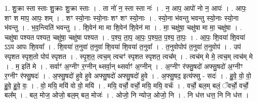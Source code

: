 \documentclass[17pt]{extarticle}
\begin{document}
1. शु॒क्रा स्ता स्ताः शु॒क्राः शु॒क्रा स्ताः । . ता नो॑ न॒ स्ता स्ता नः॑ । . न॒ आप॒ आपो॑ नो न॒ आपः॑ । . आपः॒ शꣳ श माप॒ आपः॒ शम् । . शꣳ स्यो॒नाः स्यो॒नाः शꣳ शꣳ स्यो॒नाः । . स्यो॒ना भ॑वन्तु भवन्तु स्यो॒नाः स्यो॒ना भ॑वन्तु । . भ॒व॒न्त्विति॑ भवन्तु । . शि॒वेन॑ मा मा शि॒वेन॑ शि॒वेन॑ मा । . मा॒ चक्षु॑षा॒ चक्षु॑षा मा मा॒ चक्षु॑षा । . चक्षु॑षा पश्यत पश्यत॒ चक्षु॑षा॒ चक्षु॑षा पश्यत । . प॒श्य॒ ता॒प॒ आ॒पः॒ प॒श्य॒त॒ प॒श्य॒ ता॒पः॒ । . आ॒पः॒ शि॒वया॑ शि॒वया॑ ऽऽप आपः शि॒वया᳚ । . शि॒वया॑ त॒नुवा॑ त॒नुवा॑ शि॒वया॑ शि॒वया॑ त॒नुवा᳚ । . त॒नुवोपोप॑ त॒नुवा॑ त॒नुवोप॑ । . उप॑ स्पृशत स्पृश॒तो पोप॑ स्पृशत । . स्पृ॒श॒त॒ त्वच॒म् त्वचꣳ॑ स्पृशत स्पृशत॒ त्वच᳚म् । . त्वच॑म् मे मे॒ त्वच॒म् त्वच॑म् मे । . म॒ इति॑ मे । . सर्वाꣳ॑ अ॒ग्नीꣳ र॒ग्नीन् थ्सर्वा॒न् थ्सर्वाꣳ॑ अ॒ग्नीन् । . अ॒ग्नीꣳ र॑फ्सु॒षदो॑ अफ्सु॒षदो॑ अ॒ग्नीꣳ र॒ग्नीꣳ र॑फ्सु॒षदः॑ । . अ॒फ्सु॒षदो॑ हुवे हुवे अफ्सु॒षदो॑ अफ्सु॒षदो॑ हुवे । . अ॒फ्सु॒षद॒ इत्य॑फ्सु - सदः॑ । . हु॒वे॒ वो॒ वो॒ हु॒वे॒ हु॒वे॒ वः॒ । . वो॒ मयि॒ मयि॑ वो वो॒ मयि॑ । . मयि॒ वर्चो॒ वर्चो॒ मयि॒ मयि॒ वर्चः॑ । . वर्चो॒ बल॒म् बलं॒ ॅवर्चो॒ वर्चो॒ बल᳚म् । . बल॒ मोज॒ ओजो॒ बल॒म् बल॒ मोजः॑ । . ओजो॒ नि न्योज॒ ओजो॒ नि । . नि ध॑त्त धत्त॒ नि नि ध॑त्त । \newline
\end{document}
